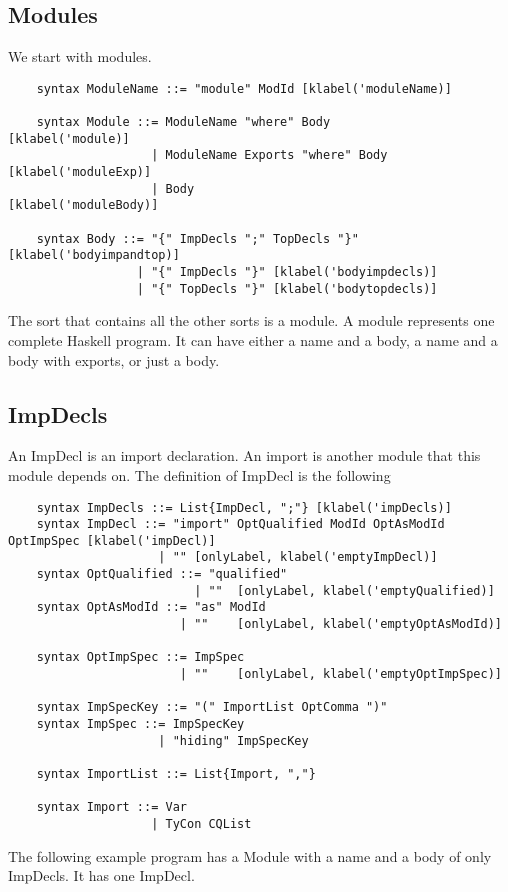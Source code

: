 \subsection{Modules}
We start with modules.
\begin{lstlisting}
    syntax ModuleName ::= "module" ModId [klabel('moduleName)]

    syntax Module ::= ModuleName "where" Body          [klabel('module)]
                    | ModuleName Exports "where" Body  [klabel('moduleExp)]
                    | Body                             [klabel('moduleBody)]

    syntax Body ::= "{" ImpDecls ";" TopDecls "}" [klabel('bodyimpandtop)]
                  | "{" ImpDecls "}" [klabel('bodyimpdecls)]
                  | "{" TopDecls "}" [klabel('bodytopdecls)]
\end{lstlisting}

The sort that contains all the other sorts is a module. A module represents one complete Haskell program. It can have either a name and a body, a name and a body with exports, or just a body.

\subsection{ImpDecls}
An ImpDecl is an import declaration. An import is another module that this module depends on.
The definition of ImpDecl is the following
\begin{lstlisting}
    syntax ImpDecls ::= List{ImpDecl, ";"} [klabel('impDecls)]
    syntax ImpDecl ::= "import" OptQualified ModId OptAsModId OptImpSpec [klabel('impDecl)]
                     | "" [onlyLabel, klabel('emptyImpDecl)]
    syntax OptQualified ::= "qualified"
                          | ""  [onlyLabel, klabel('emptyQualified)]
    syntax OptAsModId ::= "as" ModId
                        | ""    [onlyLabel, klabel('emptyOptAsModId)]

    syntax OptImpSpec ::= ImpSpec
                        | ""    [onlyLabel, klabel('emptyOptImpSpec)]

    syntax ImpSpecKey ::= "(" ImportList OptComma ")"
    syntax ImpSpec ::= ImpSpecKey
                     | "hiding" ImpSpecKey

    syntax ImportList ::= List{Import, ","}

    syntax Import ::= Var
                    | TyCon CQList
\end{lstlisting}

The following example program has a Module with a name and a body of only ImpDecls. It has one ImpDecl.

